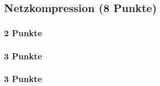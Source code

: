 \newif\ifvimbug
\vimbugfalse

\ifvimbug

\fi


\subsection{Netzkompression (8 Punkte)}
\subsubsection{2 Punkte}
\subsubsection{3 Punkte}
\subsubsection{3 Punkte}